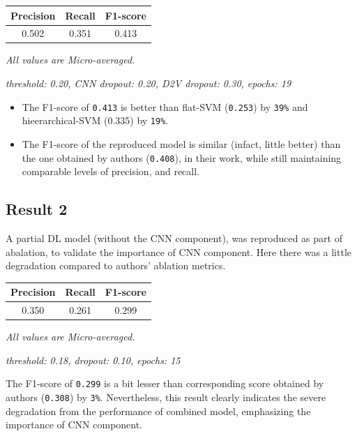 \documentclass[11pt,a4paper]{article}
\begin{document}
\begin{small}
\begin{tabular}{ ccc }
  \hline
  	Precision & Recall & F1-score \\
  \hline
  	0.502 & 0.351 & 0.413 \\
  \hline
\end{tabular}

\textit{All values are Micro-averaged.}

\textit{threshold: 0.20, CNN dropout: 0.20, D2V dropout: 0.30, epochs: 19}
\end{small}
\newline

\begin{itemize}
	\item The F1-score of \texttt{0.413} is better than flat-SVM (\texttt{0.253}) by \texttt{39\%} and hieerarchical-SVM (0.335) by \texttt{19\%}.
	\item The F1-score of the reproduced model is similar (infact, little better) than the one obtained by authors (\texttt{0.408}), in their work, while still maintaining comparable levels of precision, and recall.
\end{itemize}

\subsection{Result 2}

A partial DL model (without the CNN component), was reproduced as part of abalation, to validate the importance of CNN component. Here there was a little degradation compared to authors' ablation metrics.
\newline

\begin{small}
\begin{tabular}{ ccc }
  \hline
  	Precision & Recall & F1-score \\
  \hline
  	0.350 & 0.261 & 0.299 \\
  \hline
\end{tabular}

\textit{All values are Micro-averaged.}

\textit{threshold: 0.18, dropout: 0.10, epochs: 15}
\end{small}
\newline


The F1-score of \texttt{0.299} is a bit lesser than corresponding score obtained by authors (\texttt{0.308}) by \texttt{3\%}. Nevertheless, this result clearly indicates the severe degradation from the performance of combined model, emphasizing the importance of CNN component.
\end{document}
